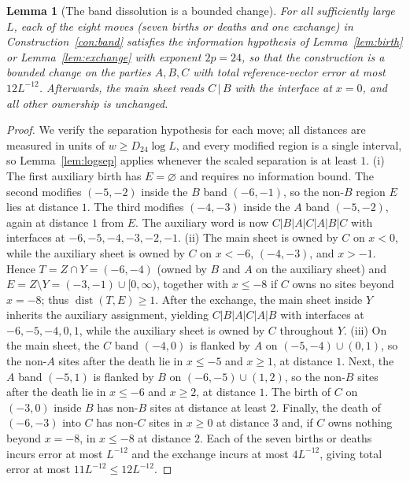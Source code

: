 \documentclass[aps,prx,reprint,superscriptaddress,floatfix,nofootinbib,longbibliography,amsmath,amssymb]{revtex4-2}
\newcommand{\dist}{\operatorname{dist}}
\theoremstyle{plain}
\newtheorem{lemma}[theorem]{Lemma}
\theoremstyle{definition}
\begin{document}
\begin{lemma}[The band dissolution is a bounded change]\label{lem:band}
For all sufficiently large $L$, each of the eight moves (seven births or
deaths and one exchange) in Construction~\ref{con:band} satisfies the information hypothesis of
Lemma~\ref{lem:birth} or Lemma~\ref{lem:exchange} with exponent $2p=24$,
so that the construction is a bounded change on the parties $A,B,C$ with
total reference-vector error at most $12L^{-12}$. Afterwards, the main
sheet reads $C\,|\,B$ with the interface at $x=0$, and all other ownership
is unchanged.
\end{lemma}
\begin{proof}
We verify the separation hypothesis for each move; all distances are measured in units of $w\ge D_{24}\log L$, and
every modified region is a single interval, so Lemma~\ref{lem:logsep} applies whenever the scaled separation is at least $1$.
(i) The first auxiliary birth has $E=\varnothing$ and requires no
information bound. The second modifies $(-5,-2)$ inside the
$B$ band $(-6,-1)$, so the non-$B$ region $E$ lies at distance $1$. The
third modifies $(-4,-3)$ inside the $A$ band $(-5,-2)$, again at distance $1$ from $E$. The
auxiliary word is now $C|B|A|C|A|B|C$ with interfaces at $-6,-5,-4,-3,-2,-1$.
(ii) The main sheet is owned by $C$ on $x<0$, while the auxiliary sheet is owned by $C$ on
$x<-6$, $(-4,-3)$, and $x>-1$. Hence $T=Z\cap Y=(-6,-4)$ (owned by $B$ and
$A$ on the auxiliary sheet) and $E=Z\setminus Y=(-3,-1)\cup[0,\infty)$, together with $x\le-8$ if $C$
owns no sites beyond $x=-8$; thus $\dist(T,E)\ge 1$.
After the exchange, the main sheet inside $Y$ inherits the auxiliary
assignment, yielding $C|B|A|C|A|B$ with interfaces at $-6,-5,-4,0,1$, while the auxiliary sheet
is owned by $C$ throughout $Y$.
(iii) On the main sheet, the $C$ band $(-4,0)$ is flanked by $A$ on $(-5,-4)\cup(0,1)$,
so the non-$A$ sites after the death lie in $x\le-5$ and $x\ge1$, at
distance $1$. Next, the $A$ band $(-5,1)$ is flanked by $B$ on
$(-6,-5)\cup(1,2)$, so the non-$B$ sites after the death lie in $x\le-6$ and $x\ge2$,
at distance $1$. The birth of $C$ on $(-3,0)$ inside $B$ has non-$B$ sites
at distance at least $2$. Finally, the death of $(-6,-3)$ into $C$ has non-$C$ sites in
$x\ge0$ at distance $3$ and, if $C$ owns nothing beyond $x=-8$, in
$x\le-8$ at distance $2$. Each of the seven births or deaths incurs error at most $L^{-12}$ and the exchange incurs at most
$4L^{-12}$, giving total error at most $11L^{-12}\le 12L^{-12}$.
\end{proof}
\end{document}

